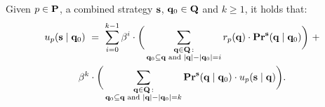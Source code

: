 

\begin{mylem}\label{lem-dist-k}
Given $p \in \mathbf{P}$, a combined strategy $\mathbf{s}$, $\mathbf{q}_0 \in \mathbf{Q}$ and $k \geq 1$, it holds that:
\begin{multline*}
u_p(\mathbf{s} \mid \mathbf{q}_0) \ = \  
\sum_{i=0}^{k-1} \beta^i \cdot \bigg(\sum_{\substack{\mathbf{q} \in \mathbf{Q} \,: \\ \mathbf{q}_0 \subseteq \mathbf{q} \text{ {\rm and} } |\mathbf{q}| - |\mathbf{q}_0| = i}}
r_p(\mathbf{q}) \cdot \mathbf{Pr}^{\mathbf{s}}(\mathbf{q} \mid \mathbf{q}_0)\bigg) \ + \\
\beta^k \cdot 
\bigg(\sum_{\substack{\mathbf{q} \in \mathbf{Q} \,: \\ \mathbf{q}_0 \subseteq \mathbf{q} \text{ {\rm and} } |\mathbf{q}| - |\mathbf{q}_0| = k}}
\mathbf{Pr}^{\mathbf{s}}(\mathbf{q} \mid \mathbf{q}_0) \cdot u_p(\mathbf{s} \mid \mathbf{q})\bigg).
\end{multline*}
\end{mylem}

